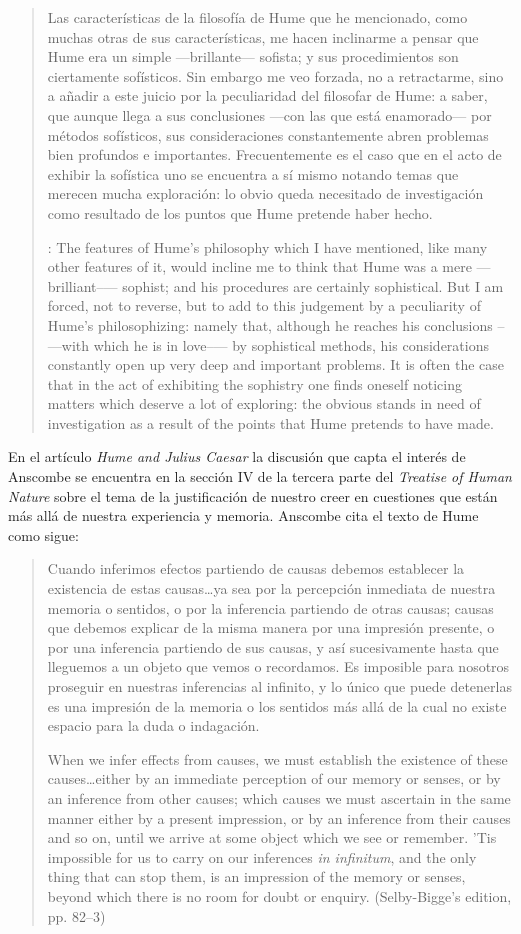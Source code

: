   \blockquote[{\cite[172]{anscombe1981mmph}}: The features of Hume’s philosophy
  which I have mentioned, like many other features of it, would incline me to
  think that Hume was a mere ---brilliant--— sophist; and his procedures are
  certainly sophistical. But I am forced, not to reverse, but to add to this
  judgement by a peculiarity of Hume’s philosophizing: namely that, although he
  reaches his conclusions --—with which he is in love--— by sophistical methods,
  his considerations constantly open up very deep and important problems. It is
  often the case that in the act of exhibiting the sophistry one finds oneself
  noticing matters which deserve a lot of exploring: the obvious stands in need of
  investigation as a result of the points that Hume pretends to have made.]{Las
    características de la filosofía de Hume que he mencionado, como muchas otras
    de sus características, me hacen inclinarme a pensar que Hume era un simple
    ---brillante--- sofista; y sus procedimientos son ciertamente sofísticos. Sin
    embargo me veo forzada, no a retractarme, sino a añadir a este juicio por la
    peculiaridad del filosofar de Hume: a saber, que aunque llega a sus
    conclusiones ---con las que está enamorado--- por métodos sofísticos, sus
    consideraciones constantemente abren problemas bien profundos e importantes.
    Frecuentemente es el caso que en el acto de exhibir la sofística uno se
    encuentra a sí mismo notando temas que merecen mucha exploración: lo obvio
    queda necesitado de investigación como resultado de los puntos que Hume
    pretende haber hecho.}

En el artículo \emph{Hume and Julius Caesar} la discusión que capta el interés
de Anscombe se encuentra en la sección IV de la tercera parte del \emph{Treatise
  of Human Nature} sobre el tema de la justificación de nuestro creer en
cuestiones que están más allá de nuestra experiencia y memoria. Anscombe cita el
texto de Hume como sigue:

\blockquote[{\cite[86]{anscombe1981hjc}}When we infer effects from causes, we
must establish the existence of these causes\ldots either by an immediate
perception of our memory or senses, or by an inference from other causes; which
causes we must ascertain in the same manner either by a present impression, or
by an inference from their causes and so on, until we arrive at some object
which we see or remember. 'Tis impossible for us to carry on our inferences
\emph{in infinitum}, and the only thing that can stop them, is an impression of
the memory or senses, beyond which there is no room for doubt or enquiry.
(Selby-Bigge's edition, pp. 82--3)]{Cuando inferimos efectos partiendo de causas
  debemos establecer la existencia de estas causas\ldots ya sea por la
  percepción inmediata de nuestra memoria o sentidos, o por la inferencia
  partiendo de otras causas; causas que debemos explicar de la misma manera por
  una impresión presente, o por una inferencia partiendo de sus causas, y así
  sucesivamente hasta que lleguemos a un objeto que vemos o recordamos. Es
  imposible para nosotros proseguir en nuestras inferencias al infinito, y lo
  único que puede detenerlas es una impresión de la memoria o los sentidos más
  allá de la cual no existe espacio para la duda o indagación.}


